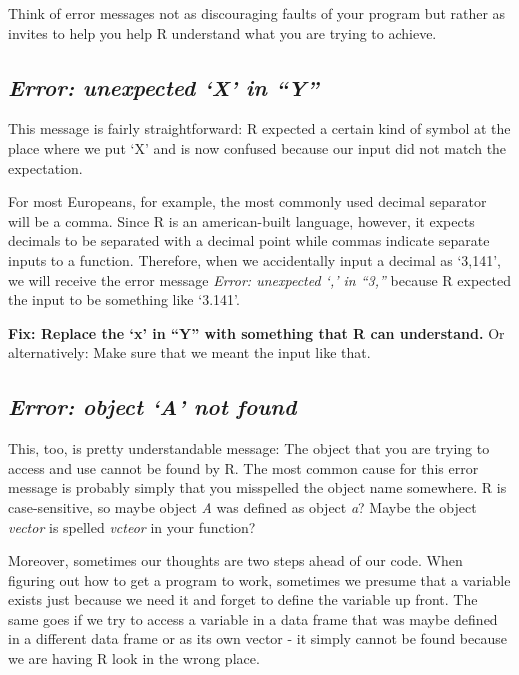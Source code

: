 \documentclass[
]{book}
\begin{document}
Think of error messages not as discouraging faults of your program but rather as invites to help you help R understand what you are trying to achieve.

\subsection*{\texorpdfstring{\emph{Error: unexpected `X' in ``Y''}}{Error: unexpected `X' in ``Y''}}\label{error-unexpected-x-in-y}

This message is fairly straightforward:
R expected a certain kind of symbol at the place where we put `X' and is now confused because our input did not match the expectation.

For most Europeans, for example, the most commonly used decimal separator will be a comma.
Since R is an american-built language, however, it expects decimals to be separated with a decimal point while commas indicate separate inputs to a function.
Therefore, when we accidentally input a decimal as `3,141', we will receive the error message \emph{Error: unexpected `,' in ``3,''} because R expected the input to be something like `3.141'.

\textbf{Fix: Replace the `x' in ``Y'' with something that R can understand.} Or alternatively: Make sure that we meant the input like that.

\subsection*{\texorpdfstring{\emph{Error: object `A' not found}}{Error: object `A' not found}}\label{error-object-a-not-found}

This, too, is pretty understandable message:
The object that you are trying to access and use cannot be found by R.
The most common cause for this error message is probably simply that you misspelled the object name somewhere.
R is case-sensitive, so maybe object \emph{A} was defined as object \emph{a}?
Maybe the object \emph{vector} is spelled \emph{vcteor} in your function?

Moreover, sometimes our thoughts are two steps ahead of our code.
When figuring out how to get a program to work, sometimes we presume that a variable exists just because we need it and forget to define the variable up front.
The same goes if we try to access a variable in a data frame that was maybe defined in a different data frame or as its own vector - it simply cannot be found because we are having R look in the wrong place.
\end{document}
